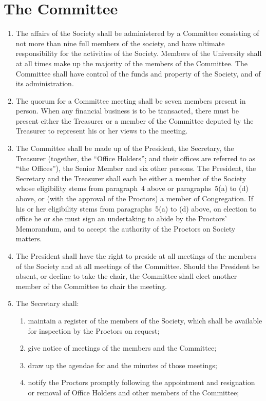 \documentclass[11pt]{article}
\begin{document}
\section{The Committee}
\begin{enumerate}
\item The affairs of the Society shall be administered by a Committee consisting of not more than nine full members of the society, and have ultimate responsibility for the activities of the Society. Members of the University shall at all times make up the majority of the members of the Committee. The Committee shall have control of the funds and property of the Society, and of its administration.
\item The quorum for a Committee meeting shall be seven members present in person. When any financial business is to be transacted, there must be present either the Treasurer or a member of the Committee deputed by the Treasurer to represent his or her views to the meeting.
\item The Committee shall be made up of the President, the Secretary, the Treasurer (together, the ``Office Holders''; and their offices are referred to as ``the Offices''), the Senior Member and six other persons. The President, the Secretary and the Treasurer shall each be either a member of the Society whose eligibility stems from paragraph~4 above or paragraphs~5(a) to (d) above, or (with the approval of the Proctors) a member of Congregation. If his or her eligibility stems from paragraphs~5(a) to (d) above, on election to office he or she must sign an undertaking to abide by the Proctors' Memorandum, and to accept the authority of the Proctors on Society matters.
\item The President shall have the right to preside at all meetings of the members of the Society and at all meetings of the Committee. Should the President be absent, or decline to take the chair, the Committee shall elect another member of the Committee to chair the meeting.
\item The Secretary shall:
\begin{enumerate}
\item maintain a register of the members of the Society, which shall be available for inspection by the Proctors on request;
\item give notice of meetings of the members and the Committee;
\item draw up the agendae for and the minutes of those meetings;
\item notify the Proctors promptly following the appointment and resignation or removal of Office Holders and other members of the Committee;

\end{enumerate}
\end{enumerate}
\end{document}
